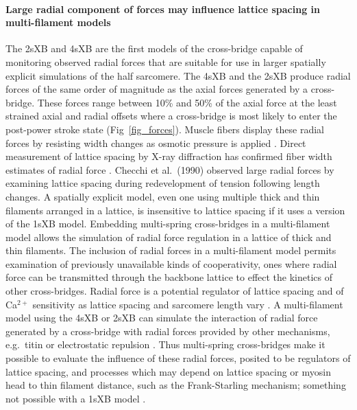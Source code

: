 \documentclass[10pt]{article}
\newcommand{\citep}[1]{\cite{#1}} %
\begin{document}
\paragraph{Large radial component of forces may influence lattice spacing in multi-filament models} %
The 2sXB and 4sXB are the first models of the cross-bridge capable of monitoring observed radial forces that are suitable for use in larger spatially explicit simulations of the half sarcomere. 
The 4sXB and the 2sXB produce radial forces of the same order of magnitude as the axial forces generated by a cross-bridge. 
These forces range between 10\% and 50\% of the axial force at the least strained axial and radial offsets where a cross-bridge is most likely to enter the post-power stroke state (Fig~\ref{fig_forces}).
Muscle fibers display these radial forces by resisting width changes as osmotic pressure is applied \citep{Maughan1981}.
Direct measurement of lattice spacing by X-ray diffraction has confirmed fiber width estimates of radial force \citep{Matsubara1984}.
Checchi et al.~(1990) \citep{Cecchi1990} observed large radial forces by examining lattice spacing during redevelopment of tension following length changes. 
A spatially explicit model, even one using multiple thick and thin filaments arranged in a lattice, is insensitive to lattice spacing if it uses a version of the 1sXB model.  
Embedding multi-spring cross-bridges in a multi-filament model allows the simulation of radial force regulation in a lattice of thick and thin filaments.  
The inclusion of radial forces in a multi-filament model permits examination of previously unavailable kinds of cooperativity, ones where radial force can be transmitted through the backbone lattice to effect the kinetics of other cross-bridges. 
Radial force is a potential regulator of lattice spacing and of Ca$^{2+}$ sensitivity as lattice spacing and sarcomere length vary \citep{Millman1998}.  
A multi-filament model using the 4sXB or 2sXB can simulate the interaction of radial force generated by a cross-bridge with radial forces provided by other mechanisms, e.g.\ titin or electrostatic repulsion \citep{Martyn2004, Cazorla2001, Millman1998}. 
Thus multi-spring cross-bridges make it possible to evaluate the influence of these radial forces, posited to be regulators of lattice spacing, and processes which may depend on lattice spacing or myosin head to thin filament distance, such as the Frank-Starling mechanism; something not possible with a 1sXB model \citep{Smith2009}. 
\end{document}
